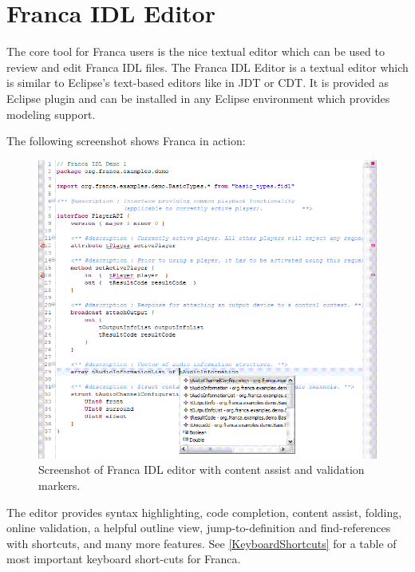 \documentclass[a4paper,10pt]{scrreprt}
\begin{document}
\section{Franca IDL Editor}
\label{FrancaTooling_Editor}
The core tool for Franca users is the nice textual editor which can be used
to review and edit Franca IDL files. The Franca IDL Editor is a textual editor
which is similar to Eclipse's text-based editors like in JDT or CDT.
It is provided as Eclipse plugin and can be installed in any Eclipse environment
which provides modeling support.

The following screenshot shows Franca in action:

\begin{figure}[!ht]
\centering
\includegraphics[width=\textwidth]{images/franca_editor_screenshot_1.png}
\caption{Screenshot of Franca IDL editor with
	content assist and validation markers.}
\end{figure}

The editor provides syntax highlighting,
code completion, content assist, folding, online validation, a helpful outline view,
jump-to-definition and find-references with shortcuts, and many more features.
See \autoref{KeyboardShortcuts} for a table of most important keyboard short-cuts for Franca.
\end{document}
